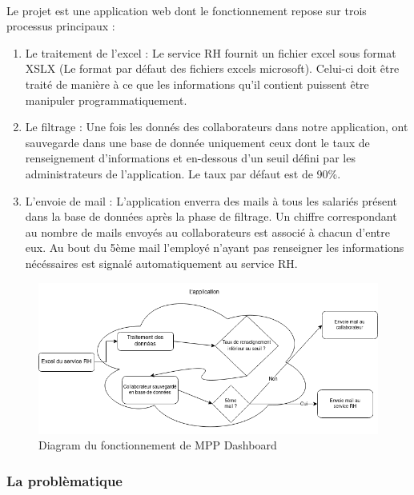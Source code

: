 \documentclass[12pt]{article}
\begin{document}
\begin {sloppypar}
\paragraph {} 
Le projet est une application web dont le fonctionnement repose sur trois processus
principaux : 
\begin {enumerate}
  \item 
    Le traitement de l'excel : Le service RH fournit un fichier excel sous format XSLX 
    (Le format par défaut des fichiers excels microsoft). Celui-ci doit être traité de 
    manière à ce que les informations qu'il contient puissent être manipuler 
    programmatiquement.
  \item 
    Le filtrage : Une fois les donnés des collaborateurs dans notre application, ont
    sauvegarde dans une base de donnée uniquement ceux dont le taux de renseignement 
    d'informations et en-dessous d'un seuil défini par les administrateurs de 
    l'application. Le taux par défaut est de 90\%. 
  \item 
    L'envoie de mail : L'application enverra des mails à tous les salariés présent 
    dans la base de données après la phase de filtrage. Un chiffre correspondant au nombre
    de mails envoyés au collaborateurs est associé à chacun d'entre eux. Au bout du 
    5ème mail l'employé n'ayant pas renseigner les informations nécéssaires est signalé 
    automatiquement au service RH.
\end{enumerate}
\newpage
\begin{figure}
  \includegraphics[width=\textwidth] {mpp-diagram.png}
  \caption {Diagram du fonctionnement de MPP Dashboard}
\end{figure}
\subsubsection{La problèmatique}
\end{sloppypar}
\end{document}
